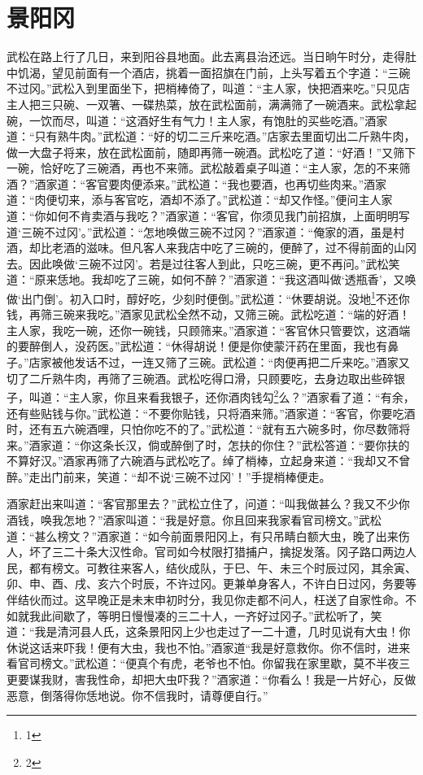 \documentclass[12pt,UTF-8,openany]{ctexbook}
\begin{document}
\chapter{景阳冈}

\begin{large}
    
    武松在路上行了几日，来到阳谷县地面。此去离县治还远。当日晌午时分，走得肚中饥渴，望见前面有一个酒店，挑着一面招旗在门前，上头写着五个字道：“三碗不过冈。”武松入到里面坐下，把梢棒倚了，叫道：“主人家，快把酒来吃。”只见店主人把三只碗、一双箸、一碟热菜，放在武松面前，满满筛了一碗酒来。武松拿起碗，一饮而尽，叫道：“这酒好生有气力！主人家，有饱肚的买些吃酒。”酒家道：“只有熟牛肉。”武松道：“好的切二三斤来吃酒。”店家去里面切出二斤熟牛肉，做一大盘子将来，放在武松面前，随即再筛一碗酒。武松吃了道：“好酒！”又筛下一碗，恰好吃了三碗酒，再也不来筛。武松敲着桌子叫道：“主人家，怎的不来筛酒？”酒家道：“客官要肉便添来。”武松道：“我也要酒，也再切些肉来。”酒家道：“肉便切来，添与客官吃，酒却不添了。”武松道：“却又作怪。”便问主人家道：“你如何不肯卖酒与我吃？”酒家道：“客官，你须见我门前招旗，上面明明写道‘三碗不过冈’。”武松道：“怎地唤做三碗不过冈？”酒家道：“俺家的酒，虽是村酒，却比老酒的滋味。但凡客人来我店中吃了三碗的，便醉了，过不得前面的山冈去。因此唤做‘三碗不过冈’。若是过往客人到此，只吃三碗，更不再问。”武松笑道：“原来恁地。我却吃了三碗，如何不醉？”酒家道：“我这酒叫做‘透瓶香’，又唤做‘出门倒’。初入口时，醇好吃，少刻时便倒。”武松道：“休要胡说。没地\footnote{1}不还你钱，再筛三碗来我吃。”酒家见武松全然不动，又筛三碗。武松吃道：“端的好酒！主人家，我吃一碗，还你一碗钱，只顾筛来。”酒家道：“客官休只管要饮，这酒端的要醉倒人，没药医。”武松道：“休得胡说！便是你使蒙汗药在里面，我也有鼻子。”店家被他发话不过，一连又筛了三碗。武松道：“肉便再把二斤来吃。”酒家又切了二斤熟牛肉，再筛了三碗酒。武松吃得口滑，只顾要吃，去身边取出些碎银子，叫道：“主人家，你且来看我银子，还你酒肉钱勾\footnote{2}么？”酒家看了道：“有余，还有些贴钱与你。”武松道：“不要你贴钱，只将酒来筛。”酒家道：“客官，你要吃酒时，还有五六碗酒哩，只怕你吃不的了。”武松道：“就有五六碗多时，你尽数筛将来。”酒家道：“你这条长汉，倘或醉倒了时，怎扶的你住？”武松答道：“要你扶的不算好汉。”酒家再筛了六碗酒与武松吃了。绰了梢棒，立起身来道：“我却又不曾醉。”走出门前来，笑道：“却不说‘三碗不过冈’！”手提梢棒便走。
    
    酒家赶出来叫道：“客官那里去？”武松立住了，问道：“叫我做甚么？我又不少你酒钱，唤我怎地？”酒家叫道：“我是好意。你且回来我家看官司榜文。”武松道：“甚么榜文？”酒家道：“如今前面景阳冈上，有只吊睛白额大虫，晚了出来伤人，坏了三二十条大汉性命。官司如今杖限打猎捕户，擒捉发落。冈子路口两边人民，都有榜文。可教往来客人，结伙成队，于巳、午、未三个时辰过冈，其余寅、卯、申、酉、戌、亥六个时辰，不许过冈。更兼单身客人，不许白日过冈，务要等伴结伙而过。这早晚正是未末申初时分，我见你走都不问人，枉送了自家性命。不如就我此间歇了，等明日慢慢凑的三二十人，一齐好过冈子。”武松听了，笑道：“我是清河县人氏，这条景阳冈上少也走过了一二十遭，几时见说有大虫！你休说这话来吓我！便有大虫，我也不怕。”酒家道“我是好意救你。你不信时，进来看官司榜文。”武松道：“便真个有虎，老爷也不怕。你留我在家里歇，莫不半夜三更要谋我财，害我性命，却把大虫吓我？”酒家道：“你看么！我是一片好心，反做恶意，倒落得你恁地说。你不信我时，请尊便自行。”
    

\end{large}
\end{document}

